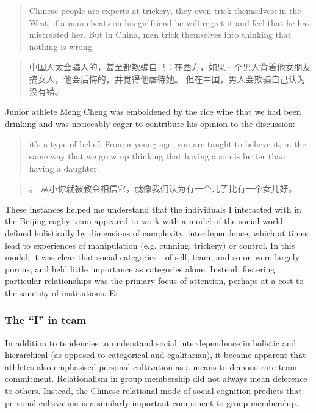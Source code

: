 \begin{CJK}{UTF8}{gbsn}
   \begin{quote}
     Chinese people are experts at trickery, they even trick themselves: in the West, if a man cheats on his girlfriend he will regret it and feel that he has mistreated her.  But in China, men trick themselves into thinking that nothing is wrong.
   \end{quote}
   \begin{quote}
     中国人太会骗人的，甚至都欺骗自己：在西方，如果一个男人背着他女朋友搞女人，他会后悔的，并觉得他虐待她。 但在中国，男人会欺骗自己认为没有错。
   \end{quote}

Junior athlete Meng Cheng was emboldened by the rice wine that we had been drinking and was noticeably eager to contribute his opinion to the discussion:

     \begin{quote}
       \textellipsis it's a type of belief. From a young age, you are taught to believe it, in the same way that we grow up thinking that having a son is better than having a daughter.
     \end{quote}
     \begin{quote}
       。 从小你就被教会相信它，就像我们认为有一个儿子比有一个女儿好。
     \end{quote}

These instances helped me understand that the individuals I interacted with in the Beijing rugby team appeared to work with a model of the social world defined holistically by dimensions of complexity, interdependence, which at times lead to experiences of manipulation (e.g. cunning, trickery) or control.
In this model, it was clear that social categories---of self, team, and so on were largely porous, and held little importance as categories alone.  Instead, fostering particular relationships was the primary focus of attention, perhaps at a cost to the sanctity of institutions.
E:


\subsubsection{The ``I'' in team \label{sect:IinTeam}}
In addition to tendencies to understand social interdependence in holistic and hierarchical (as opposed to categorical and egalitarian), it became apparent that athletes also emphasised personal cultivation as a means to demonstrate team commitment.  Relationalism in group membership did not always mean deference to others.  Instead, the Chinese relational mode of social cognition predicts that personal cultivation is a similarly important component to group membership.


\end{CJK}
